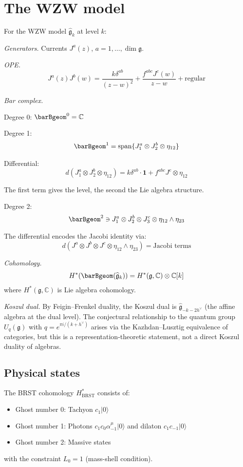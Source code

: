 \section{The WZW model}

\begin{example}
For the WZW model $\widehat{\mathfrak{g}}_k$ at level $k$:

\noindent\emph{Generators.} Currents $J^a(z)$, $a = 1, \ldots, \dim \mathfrak{g}$.

\noindent\emph{OPE.}
\[J^a(z)J^b(w) = \frac{k\delta^{ab}}{(z-w)^2} + \frac{f^{abc}J^c(w)}{z-w} + \text{regular}\]

\noindent\emph{Bar complex.}

Degree 0: $\barBgeom^0 = \mathbb{C}$

Degree 1: 
\[\barBgeom^1 = \text{span}\{J^a_1 \otimes J^b_2 \otimes \eta_{12}\}\]

Differential:
\[d(J^a_1 \otimes J^b_2 \otimes \eta_{12}) = k\delta^{ab} \cdot \mathbf{1} + f^{abc}J^c \otimes \eta_{12}\]

The first term gives the level, the second the Lie algebra structure.

Degree 2:
\[\barBgeom^2 \ni J^a_1 \otimes J^b_2 \otimes J^c_3 \otimes \eta_{12} \wedge \eta_{23}\]

The differential encodes the Jacobi identity via:
\[d(J^a \otimes J^b \otimes J^c \otimes \eta_{12} \wedge \eta_{23}) = \text{Jacobi terms}\]

\noindent\emph{Cohomology.}
\[H^*(\barBgeom(\widehat{\mathfrak{g}}_k)) = H^*(\mathfrak{g}, \mathbb{C}) \otimes \mathbb{C}[k]\]
where $H^*(\mathfrak{g}, \mathbb{C})$ is Lie algebra cohomology.

\noindent\emph{Koszul dual.} By Feigin--Frenkel duality, the Koszul dual is $\widehat{\mathfrak{g}}_{-k-2h^\vee}$ (the affine algebra at the dual level). The conjectural relationship to the quantum group $U_q(\mathfrak{g})$ with $q = e^{\pi i/(k+h^\vee)}$ arises via the Kazhdan--Lusztig equivalence of categories, but this is a representation-theoretic statement, not a direct Koszul duality of algebras.
\end{example}


\subsection{Physical states}
 
\begin{theorem}
\label{thm:brst-cohomology}
The BRST cohomology $H^*_{\text{BRST}}$ consists of:
\begin{itemize}
\item Ghost number 0: Tachyon $c_1|0\rangle$
\item Ghost number 1: Photons $c_1c_0\alpha^\mu_{-1}|0\rangle$ and dilaton $c_1c_{-1}|0\rangle$
\item Ghost number 2: Massive states
\end{itemize}
with the constraint $L_0 = 1$ (mass-shell condition).
\end{theorem}
 
